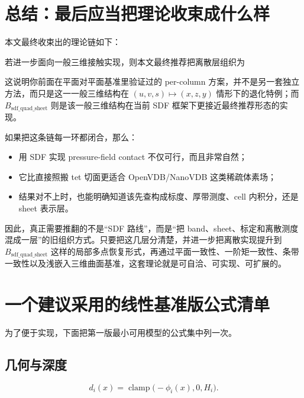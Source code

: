 \documentclass[12pt,a4paper]{ctexart}
\begin{document}
\section{总结：最后应当把理论收束成什么样}

本文最终收束出的理论链如下：
\begin{center}
\end{center}

若进一步面向一般三维接触实现，则本文最终推荐把离散层组织为
\begin{center}
\end{center}
这说明你前面在平面对平面基准里验证过的 per-column 方案，并不是另一套独立方法，而只是这一一般三维结构在 $(u,v,s)\mapsto(x,z,y)$ 情形下的退化特例；而 $B_{\mathrm{sdf\_quad\_sheet}}$ 则是该一般三维结构在当前 SDF 框架下更接近最终推荐形态的实现。

如果把这条链每一环都闭合，那么：
\begin{itemize}
    \item 用 SDF 实现 pressure-field contact 不仅可行，而且非常自然；
    \item 它比直接照搬 tet 切面更适合 OpenVDB/NanoVDB 这类稀疏体素场；
    \item 结果对不上时，也能明确知道该先查构成标度、厚带测度、cell 内积分，还是 sheet 表示层。
\end{itemize}

因此，真正需要推翻的不是“SDF 路线”，而是“把 band、sheet、标定和离散测度混成一层”的旧组织方式。只要把这几层分清楚，并进一步把离散实现提升到 $B_{\mathrm{sdf\_quad\_sheet}}$ 这样的局部多点恢复形式，再通过平面一致性、一阶矩一致性、条带一致性以及浅嵌入三维曲面基准，这套理论就是可自洽、可实现、可扩展的。

\appendix
\section{一个建议采用的线性基准版公式清单}

为了便于实现，下面把第一版最小可用模型的公式集中列一次。

\subsection*{几何与深度}
\begin{equation}
    d_i(x)=\operatorname{clamp}\bigl(-\phi_i(x),0,H_i\bigr).
\end{equation}
\end{document}
